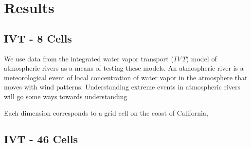 
\section{Results}

\subsection{IVT - 8 Cells}
We use data from the integrated water vapor transport (\emph{IVT}) model
  of atmospheric rivers as a means of testing these models.  An atmospheric river is a meteorological
  event of local concentration of water vapor in the atmosphere that moves with wind patterns.
  Understanding extreme events in atmospheric rivers will go some ways towards understanding



  Each dimension corresponds to a grid
  cell on the coast of California,




\subsection{IVT - 46 Cells}











